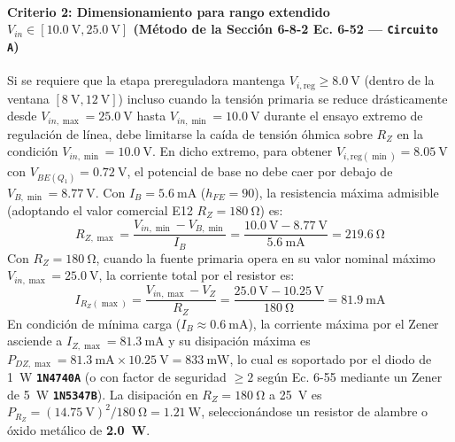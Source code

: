 \paragraph{Criterio 2: Dimensionamiento para rango extendido $V_{in} \in [\SI{10,0}{\volt}, \SI{25,0}{\volt}]$ (Método de la Sección 6-8-2 Ec. 6-52 \cite{gonzalez_p2} --- \texttt{Circuito A})}
Si se requiere que la etapa prereguladora mantenga $V_{i,\text{reg}} \ge \SI{8,0}{\volt}$ (dentro de la ventana $[\SI{8}{\volt}, \SI{12}{\volt}]$) incluso cuando la tensión primaria se reduce drásticamente desde $V_{in,\max} = \SI{25,0}{\volt}$ hasta $V_{in,\min} = \SI{10,0}{\volt}$ durante el ensayo extremo de regulación de línea, debe limitarse la caída de tensión óhmica sobre $R_Z$ en la condición $V_{in,\min} = \SI{10,0}{\volt}$. En dicho extremo, para obtener $V_{i,\text{reg}(\min)} = \SI{8,05}{\volt}$ con $V_{BE(Q_1)} = \SI{0,72}{\volt}$, el potencial de base no debe caer por debajo de $V_{B,\min} = \SI{8,77}{\volt}$. Con $I_B = \SI{5,6}{\milli\ampere}$ ($h_{FE} = 90$), la resistencia máxima admisible (adoptando el valor comercial E12 \textbf{$R_Z = \SI{180}{\ohm}$}) es:
\begin{equation}
    R_{Z,\max} = \frac{V_{in,\min} - V_{B,\min}}{I_{B}} = \frac{\SI{10,0}{\volt} - \SI{8,77}{\volt}}{\SI{5,6}{\milli\ampere}} = \SI{219,6}{\ohm}
    \label{eq:rz_criterio2}
\end{equation}
Con $R_Z = \SI{180}{\ohm}$, cuando la fuente primaria opera en su valor nominal máximo $V_{in,\max} = \SI{25,0}{\volt}$, la corriente total por el resistor es:
\begin{equation}
    I_{R_Z(\max)} = \frac{V_{in,\max} - V_Z}{R_Z} = \frac{\SI{25,0}{\volt} - \SI{10,25}{\volt}}{\SI{180}{\ohm}} = \SI{81,9}{\milli\ampere}
    \label{eq:irz_max}
\end{equation}
En condición de mínima carga ($I_B \approx \SI{0,6}{\milli\ampere}$), la corriente máxima por el Zener asciende a $I_{Z,\max} = \SI{81,3}{\milli\ampere}$ y su disipación máxima es $P_{DZ,\max} = \SI{81,3}{\milli\ampere} \times \SI{10,25}{\volt} = \SI{833}{\milli\watt}$, lo cual es soportado por el diodo de \SI{1}{\watt} \textbf{\texttt{1N4740A}} (o con factor de seguridad $\ge 2$ según Ec. 6-55 mediante un Zener de \SI{5}{\watt} \textbf{\texttt{1N5347B}}). La disipación en $R_Z = \SI{180}{\ohm}$ a \SI{25}{\volt} es $P_{R_Z} = (\SI{14,75}{\volt})^2 / \SI{180}{\ohm} = \SI{1,21}{\watt}$, seleccionándose un resistor de alambre o óxido metálico de \textbf{\SI{2,0}{\watt}}.


